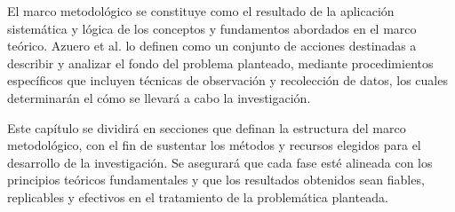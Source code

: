 El marco metodológico se constituye como el resultado de la aplicación sistemática y lógica de los conceptos y fundamentos abordados en el marco teórico. Azuero et al. \cite{azuero_2019} lo definen como un conjunto de acciones destinadas a describir y analizar el fondo del problema planteado, mediante procedimientos específicos que incluyen técnicas de observación y recolección de datos, los cuales determinarán el cómo se llevará a cabo la investigación. 

Este capítulo se dividirá en secciones que definan la estructura del marco metodológico, con el fin de sustentar los métodos y recursos elegidos para el desarrollo de la investigación. Se asegurará que cada fase esté alineada con los principios teóricos fundamentales y que los resultados obtenidos sean fiables, replicables y efectivos en el tratamiento de la problemática planteada.